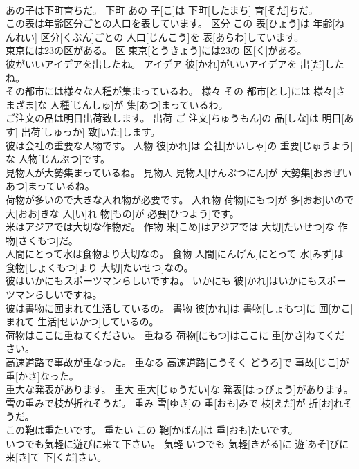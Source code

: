 \documentclass[8pt]{extreport}
\begin{document}
\begin{CJK}{UTF8}{min}
\\	あの子は下町育ちだ。	下町	あの 子[こ]は 下町[したまち] 育[そだ]ちだ。	
\\	この表は年齢区分ごとの人口を表しています。	区分	この 表[ひょう]は 年齢[ねんれい] 区分[くぶん]ごとの 人口[じんこう]を 表[あらわ]しています。	
\\	東京には23の区がある。	区	東京[とうきょう]には23の 区[く]がある。	
\\	彼がいいアイデアを出したね。	アイデア	彼[かれ]がいいアイデアを 出[だ]したね。	
\\	その都市には様々な人種が集まっているわ。	様々	その 都市[とし]には 様々[さまざま]な 人種[じんしゅ]が 集[あつ]まっているわ。	
\\	ご注文の品は明日出荷致します。	出荷	ご 注文[ちゅうもん]の 品[しな]は 明日[あす] 出荷[しゅっか] 致[いた]します。	
\\	彼は会社の重要な人物です。	人物	彼[かれ]は 会社[かいしゃ]の 重要[じゅうよう]な 人物[じんぶつ]です。	
\\	見物人が大勢集まっているね。	見物人	見物人[けんぶつにん]が 大勢集[おおぜい あつ]まっているね。	
\\	荷物が多いので大きな入れ物が必要です。	入れ物	荷物[にもつ]が 多[おお]いので 大[おお]きな 入[い]れ 物[もの]が 必要[ひつよう]です。	
\\	米はアジアでは大切な作物だ。	作物	米[こめ]はアジアでは 大切[たいせつ]な 作物[さくもつ]だ。	
\\	人間にとって水は食物より大切なの。	食物	人間[にんげん]にとって 水[みず]は 食物[しょくもつ]より 大切[たいせつ]なの。	
\\	彼はいかにもスポーツマンらしいですね。	いかにも	彼[かれ]はいかにもスポーツマンらしいですね。	
\\	彼は書物に囲まれて生活しているの。	書物	彼[かれ]は 書物[しょもつ]に 囲[かこ]まれて 生活[せいかつ]しているの。	
\\	荷物はここに重ねてください。	重ねる	荷物[にもつ]はここに 重[かさ]ねてください。	
\\	高速道路で事故が重なった。	重なる	高速道路[こうそく どうろ]で 事故[じこ]が 重[かさ]なった。	
\\	重大な発表があります。	重大	重大[じゅうだい]な 発表[はっぴょう]があります。	
\\	雪の重みで枝が折れそうだ。	重み	雪[ゆき]の 重[おも]みで 枝[えだ]が 折[お]れそうだ。	
\\	この鞄は重たいです。	重たい	この 鞄[かばん]は 重[おも]たいです。	
\\	いつでも気軽に遊びに来て下さい。	気軽	いつでも 気軽[きがる]に 遊[あそ]びに 来[き]て 下[くだ]さい。	

\end{CJK}
\end{document}

